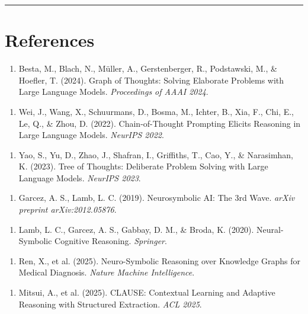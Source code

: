 \documentclass[11pt,a4paper]{article}
\begin{document}
\noindent\rule{\textwidth}{0.4pt}

\section{References}

\begin{enumerate}
  \item Besta, M., Blach, N., Müller, A., Gerstenberger, R., Podstawski, M., & Hoefler, T. (2024). Graph of Thoughts: Solving Elaborate Problems with Large Language Models. \textit{Proceedings of AAAI 2024}.
\end{enumerate}

\begin{enumerate}
  \item Wei, J., Wang, X., Schuurmans, D., Bosma, M., Ichter, B., Xia, F., Chi, E., Le, Q., & Zhou, D. (2022). Chain-of-Thought Prompting Elicits Reasoning in Large Language Models. \textit{NeurIPS 2022}.
\end{enumerate}

\begin{enumerate}
  \item Yao, S., Yu, D., Zhao, J., Shafran, I., Griffiths, T., Cao, Y., & Narasimhan, K. (2023). Tree of Thoughts: Deliberate Problem Solving with Large Language Models. \textit{NeurIPS 2023}.
\end{enumerate}

\begin{enumerate}
  \item Garcez, A. S., Lamb, L. C. (2019). Neurosymbolic AI: The 3rd Wave. \textit{arXiv preprint arXiv:2012.05876}.
\end{enumerate}

\begin{enumerate}
  \item Lamb, L. C., Garcez, A. S., Gabbay, D. M., & Broda, K. (2020). Neural-Symbolic Cognitive Reasoning. \textit{Springer}.
\end{enumerate}

\begin{enumerate}
  \item Ren, X., et al. (2025). Neuro-Symbolic Reasoning over Knowledge Graphs for Medical Diagnosis. \textit{Nature Machine Intelligence}.
\end{enumerate}

\begin{enumerate}
  \item Mitsui, A., et al. (2025). CLAUSE: Contextual Learning and Adaptive Reasoning with Structured Extraction. \textit{ACL 2025}.
\end{enumerate}
\end{document}
